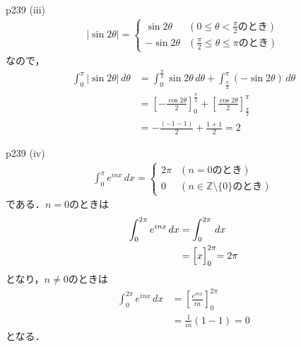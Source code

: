 \documentclass[dvipdfmx,uplatex,11pt]{jsarticle}
\begin{document}
\begin{screen}
	p239 (iii) 
	\begin{align*}
		|\sin 2 \theta| =
		\begin{cases}
			\sin 2 \theta & (0 \le \theta < \frac{\pi}{2} のとき)\\
			- \sin 2 \theta & (\frac{\pi}{2}\le \theta \le \pi のとき)
		\end{cases}
	\end{align*}
		なので，
		\begin{align*}
			\int_{0}^{\pi} |\sin 2 \theta| \, d \theta & = \int_{0}^{\frac{\pi}{2}} \sin 2 \theta \, d \theta +\int_{\frac{\pi}{2}}^{\pi} (-\sin 2 \theta) \, d \theta \\
			&= \left [-\frac{\cos 2 \theta}{2}\right]_{0}^{\frac{\pi}{2}} + \left [\frac{\cos 2 \theta}{2}\right]_{\frac{\pi}{2}}^{\pi} \\
			& = -\frac{(-1-1)}{2} + \frac{1+1}{2} = 2
		\end{align*}
	\end{screen}

	\begin{screen}
		p239 (iv) 
		\begin{align*}
			\int_{0}^{\pi} e^{inx} \, dx  =
			\begin{cases}
				2 \pi & (n=0 のとき) \\
				0 & (n \in \mathbb{Z}\setminus \{0\} のとき)
			\end{cases}
		\end{align*}
		である．$n=0$のときは
		\begin{align*}
			\int_{0}^{2 \pi} e^{inx} \, dx & = \int_{0}^{2\pi} \, dx \\
			& = \Bigl[x\Bigl]_{0}^{2\pi} = 2\pi
		\end{align*}
		となり，$n \ne 0$のときは
		\begin{align*}
			\int_{0}^{2\pi} e^{inx} \, dx & = \left [\frac{e^{inx}}{in} \right ]_{0}^{2\pi} \\
			& = \frac{1}{in} (1-1)=0
		\end{align*}
		となる．
	\end{screen}
\end{document}
